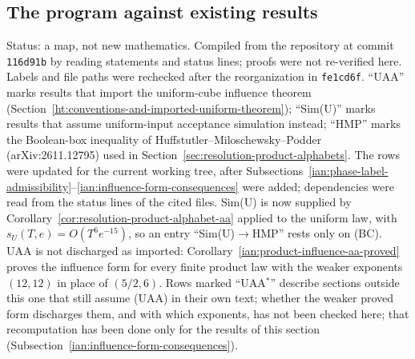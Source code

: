 \subsection{The program against existing results}\label{ian:repo-map}

Status: a map, not new mathematics. Compiled from the repository at commit \texttt{116d91b} by reading statements and status lines; proofs were not re-verified here. Labels and file paths were rechecked after the reorganization in \texttt{fe1cd6f}. ``UAA'' marks results that import the uniform-cube influence theorem (Section~\ref{ht:conventions-and-imported-uniform-theorem}); ``Sim(U)'' marks results that assume uniform-input acceptance simulation instead; ``HMP'' marks the Boolean-box inequality of Huffstutler--Miloschewsky--Podder (arXiv:2611.12795) used in Section~\ref{sec:resolution-product-alphabets}. The rows were updated for the current working tree, after Subsections~\ref{ian:phase-label-admissibility}--\ref{ian:influence-form-consequences} were added; dependencies were read from the status lines of the cited files. Sim(U) is now supplied by Corollary~\ref{cor:resolution-product-alphabet-aa} applied to the uniform law, with \(s_U(T,e)=O(T^6e^{-15})\), so an entry ``Sim(U)\(\to\)HMP'' rests only on (BC). UAA is not discharged as imported: Corollary~\ref{ian:product-influence-aa-proved} proves the influence form for every finite product law with the weaker exponents \((12,12)\) in place of \((5/2,6)\). Rows marked ``UAA\(^*\)'' describe sections outside this one that still assume (UAA) in their own text; whether the weaker proved form discharges them, and with which exponents, has not been checked here; that recomputation has been done only for the results of this section (Subsection~\ref{ian:influence-form-consequences}).


